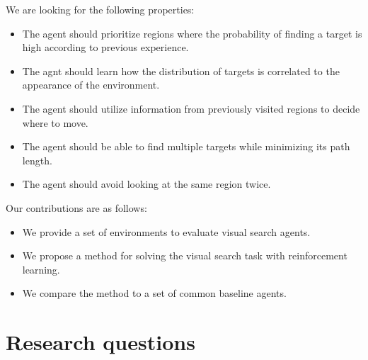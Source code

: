 We are looking for the following properties:

\begin{itemize}
  \item The agent should prioritize regions where the probability of finding a target is high according to previous experience.
  \item The agnt should learn how the distribution of targets is correlated to the appearance of the environment.
  \item The agent should utilize information from previously visited regions to decide where to move.
  \item The agent should be able to find multiple targets while minimizing its path length. %
  \item The agent should avoid looking at the same region twice. %
\end{itemize}

Our contributions are as follows:

\begin{itemize}
  \item We provide a set of environments to evaluate visual search agents.
  \item We propose a method for solving the visual search task with reinforcement learning.
  \item We compare the method to a set of common baseline agents.
\end{itemize}

\section{Research questions}
\label{sec:research-questions}

